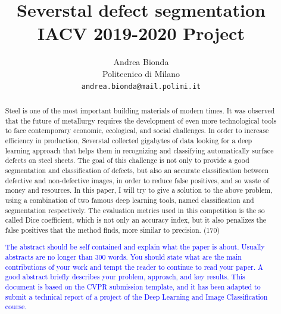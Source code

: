 \documentclass[10pt,twocolumn,letterpaper]{article}
\begin{document}
\title{Severstal defect segmentation \\ IACV 2019-2020 Project} 

\author{Andrea Bionda\\
Politecnico di Milano\\
{\tt\small andrea.bionda@mail.polimi.it}}

\maketitle

\begin{abstract}
   Steel is one of the most important building materials of modern times. It was observed that the future of metallurgy requires the development of even more technological tools to face contemporary economic, ecological, and social challenges. 
   In order to increase efficiency in production, Severstal collected gigabytes of data looking for a deep learning approach that helps them in recognizing and classifying automatically surface defects on steel sheets.
   The goal of this challenge is not only to provide a good segmentation and classification of defects, but also an accurate classification between defective and non-defective images, in order to reduce false positives, and so waste of money and resources.
   In this paper, I will try to give a solution to the above problem, using a combination of two famous deep learning tools, named classification and segmentation respectively.
   The evaluation metrics used in this competition is the so called Dice coefficient, which is not only an accuracy index, but it also penalizes the false positives that the method finds, more similar to precision. (170)

   \textcolor{blue}{
   The abstract should be self contained and explain what the paper is about. Usually abstracts are no longer than 300 words. You should state what are the main contributions of your work and tempt the reader to continue to read your paper. A good abstract briefly describes your problem, approach, and key results. This document is based on the CVPR submission template, and it has been adapted to submit a technical report of a project of the Deep Learning and Image Classification course.}
\end{abstract}

\end{document}
